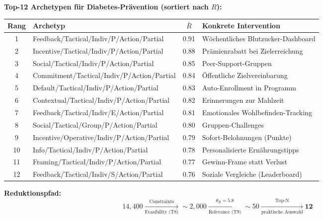 \begin{tcolorbox}[colback=green!5!white, colframe=green!75!black,
    title=\textbf{Schritt 5: Resultat --- Von 14,400 auf 12 Interventionen}]

\textbf{Top-12 Archetypen für Diabetes-Prävention (sortiert nach $R$):}

\medskip
\renewcommand{\arraystretch}{1.2}
\begin{tabular}{@{}clcl@{}}
\toprule
\textbf{Rang} & \textbf{Archetyp} & $\bar{R}$ & \textbf{Konkrete Intervention} \\
\midrule
1 & Feedback/Tactical/Indiv/P/Action/Partial & 0.91 & Wöchentliches Blutzucker-Dashboard \\
2 & Incentive/Tactical/Indiv/P/Action/Partial & 0.88 & Prämienrabatt bei Zielerreichung \\
3 & Social/Tactical/Indiv/P/Action/Partial & 0.85 & Peer-Support-Gruppen \\
4 & Commitment/Tactical/Indiv/P/Action/Partial & 0.84 & Öffentliche Zielvereinbarung \\
5 & Default/Tactical/Indiv/P/Action/Partial & 0.83 & Auto-Enrollment in Programm \\
6 & Contextual/Tactical/Indiv/P/Action/Partial & 0.82 & Erinnerungen zur Mahlzeit \\
7 & Feedback/Tactical/Indiv/E/Action/Partial & 0.81 & Emotionales Wohlbefinden-Tracking \\
8 & Social/Tactical/Group/P/Action/Partial & 0.80 & Gruppen-Challenges \\
9 & Incentive/Operative/Indiv/P/Action/Partial & 0.79 & Sofort-Belohnungen (Punkte) \\
10 & Info/Tactical/Indiv/P/Action/Partial & 0.78 & Personalisierte Ernährungstipps \\
11 & Framing/Tactical/Indiv/P/Action/Partial & 0.77 & Gewinn-Frame statt Verlust \\
12 & Feedback/Tactical/Indiv/S/Action/Partial & 0.76 & Soziale Vergleiche (Leaderboard) \\
\bottomrule
\end{tabular}

\medskip
\textbf{Reduktionspfad:}
\begin{equation*}
\boxed{14{,}400 \xrightarrow[\text{Feasibility (T8)}]{\text{Constraints}} \sim 2{,}000 \xrightarrow[\text{Relevance (T9)}]{\theta_R = 5.8} \sim 50 \xrightarrow[\text{praktische Auswahl}]{\text{Top-N}} \mathbf{12}}
\end{equation*}

\end{tcolorbox}

